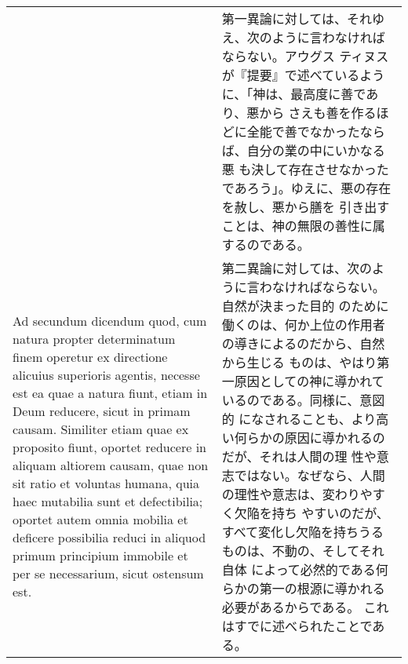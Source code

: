 \documentclass[10pt]{jsarticle}
\begin{document}
\begin{longtable}{p{21em}p{21em}}
&

第一異論に対しては、それゆえ、次のように言わなければならない。アウグス
ティヌスが『提要』で述べているように、「神は、最高度に善であり、悪から
さえも善を作るほどに全能で善でなかったならば、自分の業の中にいかなる悪
も決して存在させなかったであろう」。ゆえに、悪の存在を赦し、悪から膳を
引き出すことは、神の無限の善性に属するのである。


\\


{\sc Ad secundum dicendum} quod, cum natura propter determinatum finem
operetur ex directione alicuius superioris agentis, necesse est ea
quae a natura fiunt, etiam in Deum reducere, sicut in primam
causam. Similiter etiam quae ex proposito fiunt, oportet reducere in
aliquam altiorem causam, quae non sit ratio et voluntas humana, quia
haec mutabilia sunt et defectibilia; oportet autem omnia mobilia et
deficere possibilia reduci in aliquod primum principium immobile et
per se necessarium, sicut ostensum est.


&

第二異論に対しては、次のように言わなければならない。自然が決まった目的
のために働くのは、何か上位の作用者の導きによるのだから、自然から生じる
ものは、やはり第一原因としての神に導かれているのである。同様に、意図的
になされることも、より高い何らかの原因に導かれるのだが、それは人間の理
性や意志ではない。なぜなら、人間の理性や意志は、変わりやすく欠陥を持ち
やすいのだが、すべて変化し欠陥を持ちうるものは、不動の、そしてそれ自体
によって必然的である何らかの第一の根源に導かれる必要があるからである。
これはすでに述べられたことである。

\end{longtable}
\end{document}
